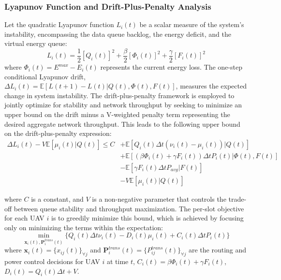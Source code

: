 \documentclass[runningheads]{llncs}
\begin{document}
\subsubsection{Lyapunov Function and Drift-Plus-Penalty Analysis}
Let the quadratic Lyapunov function $L_i(t)$ be a scalar measure of the system's instability, encompassing the data queue backlog\cite{algo1,algo2}, the energy deficit, and the virtual energy queue:
\begin{equation}
    L_{i}(t)=\frac{1}{2}[Q_{i}(t)]^{2}+\frac{\beta}{2}[\Phi_{i}(t)]^{2}+\frac{\gamma}{2}[F_{i}(t)]^{2}
\end{equation}
where $\Phi_{i}(t)=E^{max}-E_i(t)$ represents the current energy loss. The one-step conditional Lyapunov drift, $\Delta L_{i}(t) = \mathbb{E}[L(t+1)-L(t)|Q(t),\Phi(t),F(t)]$, measures the expected change in system instability. The drift-plus-penalty framework is employed to jointly optimize for stability and network throughput by seeking to minimize an upper bound on the drift minus a V-weighted penalty term representing the desired aggregate network throughput. This leads to the following upper bound on the drift-plus-penalty expression:
\begin{equation}
\begin{split}
\Delta L_{i}(t) - V\mathbb{E}[\mu_i(t)|Q(t)] \le C &+ \mathbb{E}[Q_{i}(t)\Delta t(\nu_{i}(t)-\mu_{i}(t))|Q(t)] \\
&+ \mathbb{E}[(\beta\Phi_{i}(t)+\gamma F_{i}(t))\Delta tP_{i}(t)|\Phi(t),F(t)] \\
&- \mathbb{E}[\gamma F_{i}(t)\Delta tP_{avg}|F(t)] \\
&- V\mathbb{E}[\mu_i(t)|Q(t)]
\end{split}
\end{equation}

where $C$ is a constant, and $V$ is a non-negative parameter that controls the trade-off between queue stability and throughput maximization. The per-slot objective for each UAV $i$ is to greedily minimize this bound, which is achieved by focusing only on minimizing the terms within the expectation:
\begin{equation}
\min_{\mathbf{x}_i(t),\mathbf{P}_i^{trans}(t)} \bigg\{ Q_i(t)\Delta t\nu_i(t) - D_i(t)\mu_i(t) + C_i(t)\Delta tP_i(t) \bigg\}
\end{equation}
where $\mathbf{x}_i(t)=\{x_{ij}(t)\}_{\forall j}$ and $\mathbf{P}_i^{trans}(t)=\{P_{ij}^{trans}(t)\}_{\forall j}$ are the routing and power control decisions for UAV $i$ at time $t$, $C_{i}(t)=\beta\Phi_{i}(t)+\gamma F_{i}(t)$, $D_{i}(t)=Q_{i}(t)\Delta t+V$.
\end{document}
